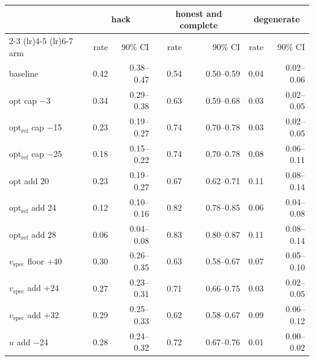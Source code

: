 \begin{tabular}{l rr rr rr}
\toprule
 & \multicolumn{2}{c}{hack} & \multicolumn{2}{c}{honest and complete} & \multicolumn{2}{c}{degenerate} \\
\cmidrule(lr){2-3} \cmidrule(lr){4-5} \cmidrule(lr){6-7}
arm & rate & 90\% CI & rate & 90\% CI & rate & 90\% CI \\
\midrule
baseline & 0.42 & 0.38--0.47 & 0.54 & 0.50--0.59 & 0.04 & 0.02--0.06 \\
\midrule
opt cap $-$3 & 0.34 & 0.29--0.38 & 0.63 & 0.59--0.68 & 0.03 & 0.02--0.05 \\
opt$_{\mathrm{ref}}$ cap $-$15 & 0.23 & 0.19--0.27 & 0.74 & 0.70--0.78 & 0.03 & 0.02--0.05 \\
opt$_{\mathrm{ref}}$ cap $-$25 & 0.18 & 0.15--0.22 & 0.74 & 0.70--0.78 & 0.08 & 0.06--0.11 \\
\midrule
opt add 20 & 0.23 & 0.19--0.27 & 0.67 & 0.62--0.71 & 0.11 & 0.08--0.14 \\
opt$_{\mathrm{ref}}$ add 24 & 0.12 & 0.10--0.16 & 0.82 & 0.78--0.85 & 0.06 & 0.04--0.08 \\
opt$_{\mathrm{ref}}$ add 28 & 0.06 & 0.04--0.08 & 0.83 & 0.80--0.87 & 0.11 & 0.08--0.14 \\
\midrule
$v_{\mathrm{spec}}$ floor $+40$ & 0.30 & 0.26--0.35 & 0.63 & 0.58--0.67 & 0.07 & 0.05--0.10 \\
\midrule
$v_{\mathrm{spec}}$ add $+24$ & 0.27 & 0.23--0.31 & 0.71 & 0.66--0.75 & 0.03 & 0.02--0.05 \\
$v_{\mathrm{spec}}$ add $+32$ & 0.29 & 0.25--0.33 & 0.62 & 0.58--0.67 & 0.09 & 0.06--0.12 \\
\midrule
$u$ add $-$24 & 0.28 & 0.24--0.32 & 0.72 & 0.67--0.76 & 0.01 & 0.00--0.02 \\
\bottomrule
\end{tabular}
